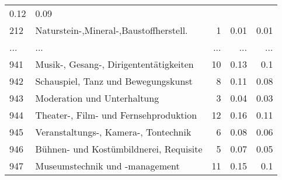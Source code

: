 \begin{longtable}{lXrrr}
          \num[round-mode=places,round-precision=2]{0.12} &
          \num[round-mode=places,round-precision=2]{0.09} \\
        212 & \multicolumn{1}{X}{Naturstein-,Mineral-,Baustoffherstell.} & %
          \num{1} &
          \num[round-mode=places,round-precision=2]{0.01} &
          \num[round-mode=places,round-precision=2]{0.01} \\
       ... & ... & ... & ... & ... \\
        941 & \multicolumn{1}{X}{Musik-, Gesang-, Dirigententätigkeiten} & %
          \num{10} &
          \num[round-mode=places,round-precision=2]{0.13} &
          \num[round-mode=places,round-precision=2]{0.1} \\

        942 & \multicolumn{1}{X}{Schauspiel, Tanz und Bewegungskunst} & %
          \num{8} &
          \num[round-mode=places,round-precision=2]{0.11} &
          \num[round-mode=places,round-precision=2]{0.08} \\

        943 & \multicolumn{1}{X}{Moderation und Unterhaltung} & %
          \num{3} &
          \num[round-mode=places,round-precision=2]{0.04} &
          \num[round-mode=places,round-precision=2]{0.03} \\

        944 & \multicolumn{1}{X}{Theater-, Film- und Fernsehproduktion} & %
          \num{12} &
          \num[round-mode=places,round-precision=2]{0.16} &
          \num[round-mode=places,round-precision=2]{0.11} \\

        945 & \multicolumn{1}{X}{Veranstaltungs-, Kamera-, Tontechnik} & %
          \num{6} &
          \num[round-mode=places,round-precision=2]{0.08} &
          \num[round-mode=places,round-precision=2]{0.06} \\

        946 & \multicolumn{1}{X}{Bühnen- und Kostümbildnerei, Requisite} & %
          \num{5} &
          \num[round-mode=places,round-precision=2]{0.07} &
          \num[round-mode=places,round-precision=2]{0.05} \\

        947 & \multicolumn{1}{X}{Museumstechnik und -management} & %
          \num{11} &
          \num[round-mode=places,round-precision=2]{0.15} &
          \num[round-mode=places,round-precision=2]{0.1} \\


\end{longtable}
